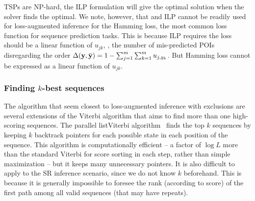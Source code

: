 TSPs are NP-hard, the ILP formulation will give the optimal solution when the solver finds the optimal. 
We note, however, that and ILP cannot be readily used for loss-augmented inference
for the Hamming loss, the most common loss function for sequence prediction tasks. 
This is because ILP requires the loss should be a linear function of $u_{jk}$,
\eg, the number of mis-predicted POIs disregarding the order $\Delta(\mathbf{y}, \bar{\mathbf{y}}) = 1 - \sum_{j=1}^m \sum_{k=1}^m u_{j, y_k}$. 
But Hamming loss cannot be expressed as a linear function of $u_{jk}$.

\subsubsection{Finding $k$-best sequences}

The algorithm that seem closest to loss-augmented inference with exclusions are several extensions 
of the Viterbi algorithm that aims to find more than one high-scoring sequences. 
The parallel listViterbi algorithm~\cite{seshadri1994list} finds the top $k$ sequences 
by keeping $k$ backtrack pointers for each possible state in each position of the sequence. 
This algorithm is computationally efficient 
-- a factor of $\log L$ more than the standard Viterbi for score sorting in each step, rather than simple maximization 
-- but it keeps many unnecessary pointers. It is also difficult to apply to the SR inference scenario, 
since we do not know $k$ beforehand. This is because it is generally impossible to foresee 
the rank (according to score) of the first path among all valid sequences (that may have repeats). 

